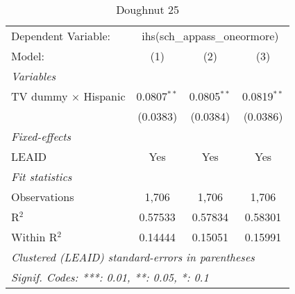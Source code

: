 \begin{table}[htbp]
\centering
\caption{Doughnut 25}
\begin{tabular}{lccc}
\tabularnewline\midrule\midrule
Dependent Variable:&\multicolumn{3}{c}{ihs(sch\_appass\_oneormore)}\\
Model:&(1) & (2) & (3)\\
\midrule \emph{Variables}&   &   &  \\
TV dummy $\times$ Hispanic & 0.0807$^{**}$ & 0.0805$^{**}$ & 0.0819$^{**}$\\
  &(0.0383) & (0.0384) & (0.0386)\\
\midrule \emph{Fixed-effects}&   &   &  \\
LEAID & Yes & Yes & Yes\\
\midrule \emph{Fit statistics}&  & & \\
Observations & 1,706&1,706&1,706\\
R$^2$ & 0.57533&0.57834&0.58301\\
Within R$^2$ & 0.14444&0.15051&0.15991\\
\midrule\midrule\multicolumn{4}{l}{\emph{Clustered (LEAID) standard-errors in parentheses}}\\
\multicolumn{4}{l}{\emph{Signif. Codes: ***: 0.01, **: 0.05, *: 0.1}}\\
\end{tabular}
\end{table}

